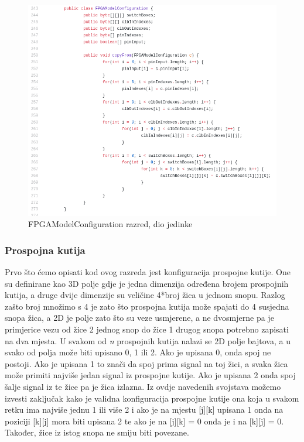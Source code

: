 \documentclass[times, utf8, zavrsni]{fer}
\begin{document}
	\begin{figure}[!htb]
		\centering
		\includegraphics[width=18cm]{slike/FPGAModelConf.png}
		\caption{FPGAModelConfiguration razred, dio jedinke}
		\label{fig:fpga-model-conf}
	\end{figure} 
	
	\subsubsection{Prospojna kutija}
	
	Prvo što ćemo opisati kod ovog razreda jest konfiguracija prospojne kutije. One su definirane kao 3D polje gdje je jedna dimenzija određena brojem prospojnih kutija, a druge dvije dimenzije su veličine 4*broj žica u jednom snopu. Razlog zašto broj množimo s 4 je zato što prospojna kutija može spajati do 4 susjedna snopa žica, a 2D je polje zato što su veze usmjerene, a ne dvosmjerne pa je primjerice vezu od žice 2 jednog snop do žice 1 drugog snopa potrebno zapisati na dva mjesta. U svakom od \emph{n} prospojnih kutija nalazi se 2D polje bajtova, a u svako od polja može biti upisano 0, 1 ili 2. Ako je upisana 0, onda spoj ne postoji. Ako je upisana 1 to znači da spoj prima signal na toj žici, a svaka žica može primiti najviše jedan signal iz prospojne kutije. Ako je upisana 2 onda spoj šalje signal iz te žice pa je žica izlazna. Iz ovdje navedenih svojstava možemo izvesti zaključak kako je validna konfiguracija prospojne kutije ona koja u svakom retku ima najviše jednu 1 ili više 2 i ako je na mjestu [j][k] upisana 1 onda na poziciji [k][j] mora biti upisana 2 te ako je na [j][k] = 0 onda je i na [k][j] = 0. Također, žice iz istog snopa ne smiju biti povezane.
	
\end{document}
